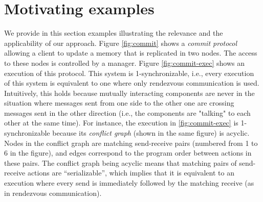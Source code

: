 \section{Motivating examples}

%
%
%
%
%
%

We provide in this section examples illustrating the relevance and the applicability of our approach. %
Figure \ref{fig:commit} shows a {\em commit protocol} allowing a client to update a memory that is replicated in two nodes. The access to these nodes is controlled by a manager. Figure \ref{fig:commit-exec} shows an execution of this protocol. This system is 1-synchronizable, i.e., every execution of this system is equivalent to one where only rendezvous communication is used. Intuitively, this holds because mutually interacting components are never in the situation where messages sent from one side to the other one are crossing messages sent in the other direction (i.e., the components are "talking" to each other at the same time). For instance, the execution in \ref{fig:commit-exec} is 1-synchronizable because its \emph{conflict graph} (shown in the same figure) is acyclic. Nodes in the conflict graph are matching send-receive pairs (numbered from 1 to 6 in the figure), and edges correspond to the program order between actions in these pairs. The conflict graph being acyclic means that matching pairs of send-receive actions are ``serializable'', which implies that it is equivalent to an execution where every send is immediately followed by the matching receive (as in rendezvous communication).

